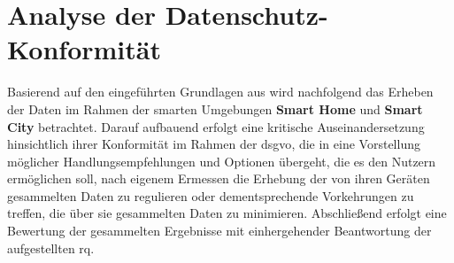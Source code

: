 
\section{Analyse der Datenschutz-Konformität}
\label{sec:Analyse der Datenschutz-Konformität}

Basierend auf den eingeführten Grundlagen aus  wird nachfolgend das Erheben der Daten im Rahmen der smarten Umgebungen \textbf{Smart Home} und \textbf{Smart City} betrachtet. Darauf aufbauend erfolgt eine kritische Auseinandersetzung hinsichtlich ihrer Konformität im Rahmen der \ac{dsgvo}, die in eine Vorstellung möglicher Handlungsempfehlungen und Optionen übergeht, die es den Nutzern ermöglichen soll, nach eigenem Ermessen die Erhebung der von ihren Geräten gesammelten Daten zu regulieren oder dementsprechende Vorkehrungen zu treffen, die über sie gesammelten Daten zu minimieren. Abschließend erfolgt eine Bewertung der gesammelten Ergebnisse mit einhergehender Beantwortung der aufgestellten \acl{rq}.

%
%

